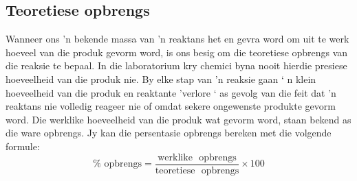 \subsection*{Teoretiese opbrengs}
Wanneer ons 'n bekende massa van 'n reaktans het en gevra word om uit te werk hoeveel van die produk gevorm word, is ons besig om die teoretiese opbrengs van die reaksie te bepaal. In die laboratorium kry chemici byna nooit hierdie presiese hoeveelheid van die produk nie. By elke stap van 'n reaksie gaan ‘ n klein hoeveelheid van die produk en reaktante 'verlore ‘ as gevolg van die feit dat  'n reaktans nie volledig reageer nie of omdat sekere ongewenste produkte gevorm word. Die werklike hoeveelheid van die produk wat gevorm word, staan bekend as die ware opbrengs. Jy kan die persentasie opbrengs bereken met die volgende formule:
\begin{equation*}
 \text{\% ~opbrengs} = \frac{\text{werklike ~opbrengs}}{\text{teoretiese ~opbrengs}} \times 100
\end{equation*}

